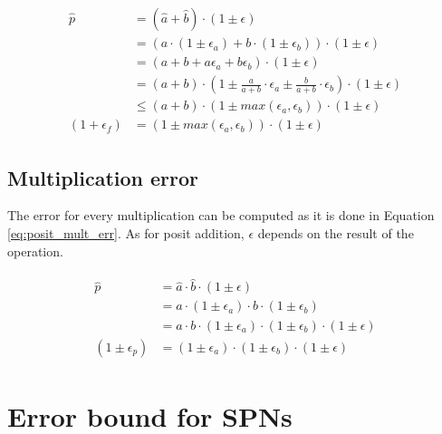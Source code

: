 \begin{align}
\begin{split}
\hat{p} &= (\hat{a} + \hat{b}) \cdot (1 \pm \epsilon)\\
		&= (a \cdot (1 \pm \epsilon_a) + b \cdot (1 \pm \epsilon_b))\cdot (1 \pm \epsilon)\\
		&= (a + b + a \epsilon_a + b \epsilon_b) \cdot (1 \pm \epsilon) \\
		&= (a + b) \cdot \left(1 \pm \frac{a}{a + b} \cdot \epsilon_a \pm \frac{b}{a+b} \cdot \epsilon_b \right) \cdot (1 \pm \epsilon) \\
		&\leq (a+b) \cdot (1 \pm max(\epsilon_a, \epsilon_b)) \cdot (1 \pm \epsilon)\\
(1+\epsilon_f) &= (1 \pm max(\epsilon_a, \epsilon_b)) \cdot (1 \pm \epsilon)
\end{split}
\label{eq:posit_add_err}
\end{align}


\subsection{Multiplication error}
The error for every multiplication can be computed as it is done in Equation \ref{eq:posit_mult_err}. As for posit addition, $\epsilon$ depends on the result of the operation.

\begin{align}
\begin{split}
\hat{p} &= \hat{a} \cdot \hat{b} \cdot (1 \pm \epsilon)\\
		&= a \cdot (1 \pm \epsilon_a) \cdot b \cdot (1 \pm \epsilon_b)\\
		&= a \cdot b \cdot (1 \pm \epsilon_a) \cdot (1 \pm \epsilon_b) \cdot (1 \pm \epsilon)\\
(1 \pm \epsilon_p) &= (1 \pm \epsilon_a) \cdot (1 \pm \epsilon_b) \cdot (1 \pm \epsilon)
\end{split}
\label{eq:posit_mult_err}
\end{align}

\section{Error bound for SPNs}

